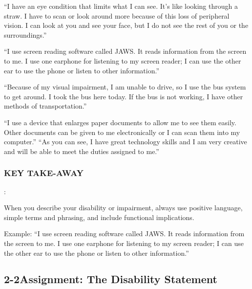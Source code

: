 ``I have an eye condition that limits what I can see. It's like looking through a straw. I have to scan or look around more because of this loss of peripheral vision. I can look at you and see your face, but I do not see the rest of you or the surroundings.''

``I use screen reading software called JAWS. It reads information from the screen to me. I use one earphone for listening to my screen reader; I can use the other ear to use the phone or listen to other information.''

``Because of my visual impairment, I am unable to drive, so I use the bus system to get around. I took the bus here today. If the bus is not working, I have other methods of transportation.''

``I use a device that enlarges paper documents to allow me to see them easily. Other documents can be given to me electronically or I can scan them into my computer.''
``As you can see, I have great technology skills and I am very creative and will be able to meet the duties assigned to me.''

\subsubsection*{KEY TAKE-AWAY}:

When you describe your disability or impairment, always use positive language, simple terms and phrasing, and include functional implications.

Example: ``I use screen reading software called JAWS. It reads information from the screen to me. I use one earphone for listening to my screen reader; I can use the other ear to use the phone or listen to other information.''

\pagebreak \subsection*{2-2\quad Assignment: The Disability Statement}

